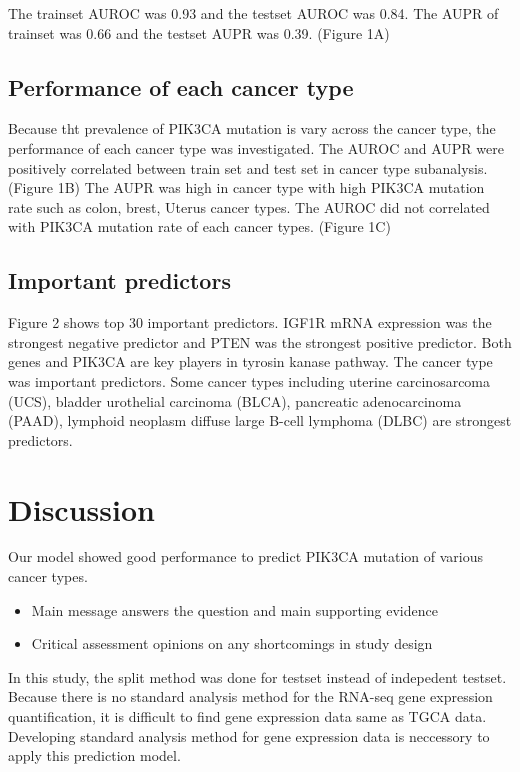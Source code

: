 \documentclass[10pt,letterpaper]{article}
\begin{document}
The trainset AUROC was 0.93 and the testset AUROC was 0.84. The AUPR of
trainset was 0.66 and the testset AUPR was 0.39. (Figure 1A)

\hypertarget{performance-of-each-cancer-type}{%
\subsection{Performance of each cancer
type}\label{performance-of-each-cancer-type}}

Because tht prevalence of PIK3CA mutation is vary across the cancer
type, the performance of each cancer type was investigated. The AUROC
and AUPR were positively correlated between train set and test set in
cancer type subanalysis. (Figure 1B) The AUPR was high in cancer type
with high PIK3CA mutation rate such as colon, brest, Uterus cancer
types. The AUROC did not correlated with PIK3CA mutation rate of each
cancer types. (Figure 1C)

\hypertarget{important-predictors}{%
\subsection{Important predictors}\label{important-predictors}}

Figure 2 shows top 30 important predictors. IGF1R mRNA expression was
the strongest negative predictor and PTEN was the strongest positive
predictor. Both genes and PIK3CA are key players in tyrosin kanase
pathway. The cancer type was important predictors. Some cancer types
including uterine carcinosarcoma (UCS), bladder urothelial carcinoma
(BLCA), pancreatic adenocarcinoma (PAAD), lymphoid neoplasm diffuse
large B-cell lymphoma (DLBC) are strongest predictors.

\hypertarget{discussion}{%
\section{Discussion}\label{discussion}}

Our model showed good performance to predict PIK3CA mutation of various
cancer types.

\begin{itemize}
\item
  Main message answers the question and main supporting evidence
\item
  Critical assessment opinions on any shortcomings in study design
\end{itemize}

In this study, the split method was done for testset instead of
indepedent testset. Because there is no standard analysis method for the
RNA-seq gene expression quantification, it is difficult to find gene
expression data same as TGCA data. Developing standard analysis method
for gene expression data is neccessory to apply this prediction model.
\end{document}
